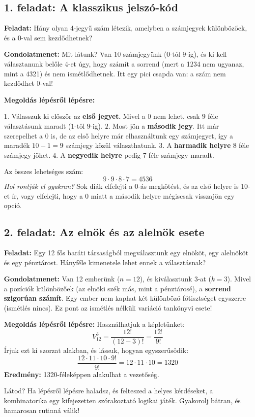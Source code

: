 \documentclass[11pt,a4paper]{article}
\begin{document}
\subsection*{1. feladat: A klasszikus jelszó-kód}
\textbf{Feladat:} Hány olyan 4-jegyű szám létezik, amelyben a számjegyek különbözőek, és a 0-val sem kezdődhetnek?

\noindent\textbf{Gondolatmenet:} 
Mit látunk? Van 10 számjegyünk ($0$-tól $9$-ig), és ki kell választanunk belőle 4-et úgy, hogy számít a sorrend (mert a 1234 nem ugyanaz, mint a 4321) és nem ismétlődhetnek. 
Itt egy pici csapda van: a szám nem kezdődhet 0-val!

\noindent\textbf{Megoldás lépésről lépésre:}
\begin{enumerate}
    $1.$ Válasszuk ki először az \textbf{első jegyet}. Mivel a 0 nem lehet, csak $9$ féle választásunk maradt ($1$-től $9$-ig).
    $2.$ Most jön a \textbf{második jegy}. Itt már szerepelhet a 0 is, de az első helyre már elhasználtunk egy számjegyet, így a maradék $10 - 1 = 9$ számjegy közül választhatunk.
    $3.$ A \textbf{harmadik helyre} $8$ féle számjegy jöhet.
    $4.$ A \textbf{negyedik helyre} pedig $7$ féle számjegy maradt.
\end{enumerate}
Az összes lehetséges szám: 
\[ 9 \cdot 9 \cdot 8 \cdot 7 = 4536 \]
\emph{Hol rontják el gyakran?} Sok diák elfelejti a 0-ás megkötést, és az első helyre is 10-et ír, vagy elfelejti, hogy a 0 miatt a második helyre mégiscsak visszajön egy opció.

\subsection*{2. feladat: Az elnök és az alelnök esete}
\textbf{Feladat:} Egy 12 fős baráti társaságból megválasztunk egy elnököt, egy alelnököt és egy pénztárost. Hányféle kimenetele lehet ennek a választásnak?

\noindent\textbf{Gondolatmenet:} 
Van 12 emberünk ($n=12$), és kiválasztunk 3-at ($k=3$). Mivel a pozíciók különbözőek (az elnöki szék más, mint a pénztárosé), a \textbf{sorrend szigorúan számít}. Egy ember nem kaphat két különböző főtisztséget egyszerre (ismétlés nincs). Ez pont az ismétlés nélküli variáció tankönyvi esete!

\noindent\textbf{Megoldás lépésről lépésre:}
Használhatjuk a képletünket:
\[ V_{12}^3 = \frac{12!}{(12-3)!} = \frac{12!}{9!} \]
Írjuk ezt ki szorzat alakban, és lássuk, hogyan egyszerűsödik:
\[ \frac{12 \cdot 11 \cdot 10 \cdot 9!}{9!} = 12 \cdot 11 \cdot 10 = 1320 \]
\textbf{Eredmény:} 1320-féleképpen alakulhat a vezetőség.

\begin{tcolorbox}[colback=mysecondary,colframe=myprimary,arc=4pt,title=\textbf{Záró gondolat}]
Látod? Ha lépésről lépésre haladsz, és felteszed a helyes kérdéseket, a kombinatorika egy kifejezetten szórakoztató logikai játék. Gyakorolj bátran, és hamarosan rutinná válik!
\end{tcolorbox}
\end{document}
